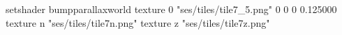 setshader bumpparallaxworld
texture 0 "ses/tiles/tile7_5.png" 0 0 0 0.125000
texture n "ses/tiles/tile7n.png"
texture z "ses/tiles/tile7z.png"

